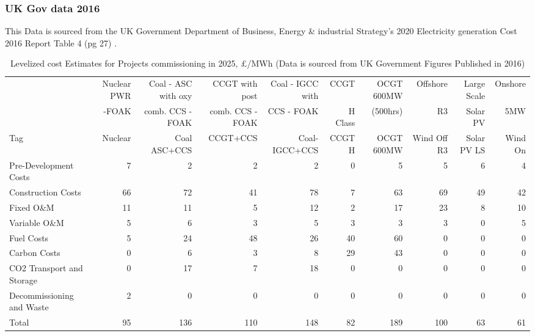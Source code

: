 \documentclass[11pt]{article}
\numberwithin{equation}{section}
\begin{document}
\subsubsection{UK Gov data 2016}
\label{sec:org293434c}
This Data is sourced from the UK Government Department of Business, Energy \& industrial Strategy's 2020 Electricity generation Cost 2016 Report Table 4 (pg 27) \cite{DeptEnerLCOE2016}.
\begin{table}
\caption{\label{tabLCOEBreakdownGov2016}Levelized cost Estimates for Projects commissioning in 2025, £/MWh (Data is sourced from UK Government Figures Published in 2016\cite{DeptEnerLCOE})}
\centering
\tiny
\begin{tabular}{lrrrrrrrrr}
\toprule
 & Nuclear PWR & Coal - ASC with oxy & CCGT with post & Coal - IGCC with & CCGT & OCGT 600MW & Offshore & Large Scale & Onshore\\
 & -FOAK & comb. CCS -FOAK & comb. CCS - FOAK & CCS - FOAK & H Class & (500hrs) & R3 & Solar PV & 5MW\\
\midrule
Tag & Nuclear & Coal ASC+CCS & CCGT+CCS & Coal-IGCC+CCS & CCGT H & OCGT 600MW & Wind Off R3 & Solar PV LS & Wind On\\
Pre-Development Costs & 7 & 2 & 2 & 2 & 0 & 5 & 5 & 6 & 4\\
Construction Costs & 66 & 72 & 41 & 78 & 7 & 63 & 69 & 49 & 42\\
Fixed O\&M & 11 & 11 & 5 & 12 & 2 & 17 & 23 & 8 & 10\\
Variable O\&M & 5 & 6 & 3 & 5 & 3 & 3 & 3 & 0 & 5\\
Fuel Costs & 5 & 24 & 48 & 26 & 40 & 60 & 0 & 0 & 0\\
Carbon Costs & 0 & 6 & 3 & 8 & 29 & 43 & 0 & 0 & 0\\
CO2 Transport and Storage \footnotemark & 0 & 17 & 7 & 18 & 0 & 0 & 0 & 0 & 0\\
Decommissioning and Waste & 2 & 0 & 0 & 0 & 0 & 0 & 0 & 0 & 0\\
Total & 95 & 136 & 110 & 148 & 82 & 189 & 100 & 63 & 61\\
\bottomrule
\end{tabular}
\end{table}
\end{document}
